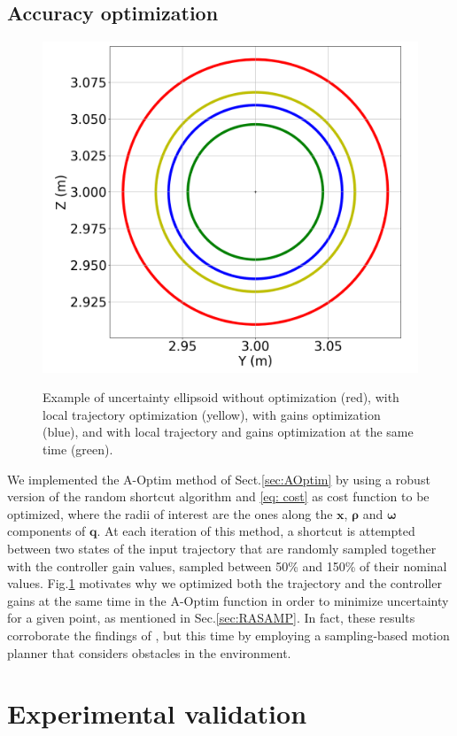 \subsection{Accuracy optimization} \label{sec:AccOptSimu}

\begin{figure} [t]
    \centering
    {\includegraphics[width=0.5\linewidth]{figures/robust_accurate/accuracy_opti.png} }%
    \caption{Example of uncertainty ellipsoid without optimization (red), with local trajectory optimization (yellow), with gains optimization (blue), and with local trajectory and gains optimization at the same time (green).}%
    \label{fig: Acc opti}%
\end{figure}

We implemented the A-Optim method of Sect.\ref{sec:AOptim} by using a robust version of the random shortcut algorithm \cite{cShortcut} and \eqref{eq: cost} as cost function to be optimized, where the radii of interest are the ones along the $\boldsymbol{x}$, $\boldsymbol{\rho}$ and $\boldsymbol{\omega}$ components of $\boldsymbol{q}$.
At each iteration of this method, a shortcut is attempted between two states of the input trajectory that are randomly sampled together with the controller gain values, sampled between 50\% and 150\% of their nominal values.
Fig.\ref{fig: Acc opti} motivates why we optimized both the trajectory and the controller gains at the same time in the A-Optim function in order to minimize uncertainty for a given point, as mentioned in Sec.\ref{sec:RASAMP}. In fact, these results corroborate the findings of \cite{AliIROS}, but this time by employing a sampling-based motion planner that considers obstacles in the environment.

\section{Experimental validation} \label{sec:Experimental}
